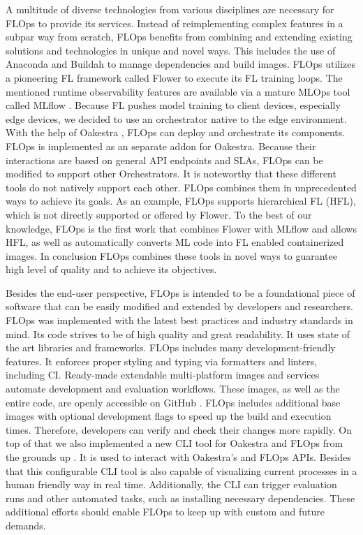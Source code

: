 A multitude of diverse technologies from various disciplines are necessary for FLOps to provide its services.
Instead of reimplementing complex features in a subpar way from scratch, FLOps benefits from combining and extending existing solutions and technologies in unique and novel ways.
This includes the use of Anaconda \cite{anaconda_docs} and Buildah \cite{buildah_homepage} to manage dependencies and build images.
FLOps utilizes a pioneering FL framework called Flower \cite{flower_docs} to execute its FL training loops.
The mentioned runtime observability features are available via a mature MLOps tool called MLflow \cite{mlflow_docs}.
Because FL pushes model training to client devices, especially edge devices, we decided to use an orchestrator native to the edge environment.
With the help of Oakestra \cite{paper:oakestra_usenix}, FLOps can deploy and orchestrate its components.
FLOps is implemented as an separate addon for Oakestra.
Because their interactions are based on general API endpoints and SLAs, FLOps can be modified to support other Orchestrators.
It is noteworthy that these different tools do not natively support each other.
FLOps combines them in unprecedented ways to achieve its goals.
As an example, FLOps supports hierarchical FL (HFL), which is not directly supported or offered by Flower.
To the best of our knowledge, FLOps is the first work that combines Flower with MLflow and allows HFL, as well as automatically converts ML code into FL enabled containerized images.
In conclusion FLOps combines these tools in novel ways to guarantee high level of quality and to achieve its objectives.

Besides the end-user perspective, FLOps is intended to be a foundational piece of software that can be easily modified and extended by developers and researchers.
FLOps was implemented with the latest best practices and industry standards in mind.
Its code strives to be of high quality and great readability.
It uses state of the art libraries and frameworks.
FLOps includes many development-friendly features.
It enforces proper styling and typing via formatters and linters, including CI.
Ready-made extendable multi-platform images and services automate development and evaluation workflows.
These images, as well as the entire code, are openly accessible on GitHub \cite{flops_code}.
FLOps includes additional base images with optional development flags to speed up the build and execution times.
Therefore, developers can verify and check their changes more rapidly.
On top of that we also implemented a new CLI tool for Oakestra and FLOps from the grounds up \cite{cli_code}.
It is used to interact with Oakestra's and FLOps APIs.
Besides that this configurable CLI tool is also capable of visualizing current processes in a human friendly way in real time.
Additionally, the CLI can trigger evaluation runs and other automated tasks, such as installing necessary dependencies.
These additional efforts should enable FLOps to keep up with custom and future demands.